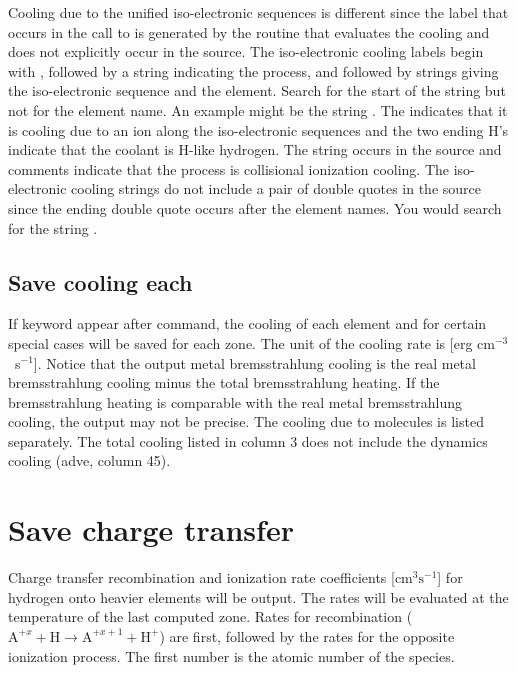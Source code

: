 Cooling due to the unified iso-electronic sequences is different since
the label that occurs in the call to  is generated by the routine
that evaluates the cooling and does not explicitly occur in the source.
The iso-electronic cooling labels begin with ,
followed by a string
indicating the process, and followed by strings giving the iso-electronic
sequence and the element.  Search for the start of the string but not for
the element name.  An example might be the string
.  The 
indicates that it is cooling due to an ion along the iso-electronic sequences
and the two ending H's indicate that the coolant is H-like hydrogen.  The
string  occurs in the source and comments indicate that the process
is collisional ionization cooling.  The iso-electronic cooling strings do
not include a pair of double quotes in the source since the ending double
quote occurs after the element names.  You would search for the string
.

\subsection{Save cooling each}

If keyword  appear after 
command, the cooling of each element and for certain
special cases will be saved for each zone. 
The unit of the cooling rate is [erg cm$^{-3}$~s$^{-1}$]. 
Notice that the output metal bremsstrahlung cooling is the real 
metal bremsstrahlung cooling minus the total bremsstrahlung heating. If the
bremsstrahlung heating is comparable with the real metal bremsstrahlung cooling,
the output may not be precise.
The cooling due to molecules is listed separately. The total cooling
listed in column 3 does not include the dynamics cooling (adve, column 45).

\section{Save charge transfer}

Charge transfer recombination and ionization rate coefficients
   [cm$^3\mathrm{s}^{-1}$]
for hydrogen onto heavier elements will be output.  The rates will be
evaluated at the temperature of the last computed zone.  Rates for
recombination (${\mathrm{A}}^{ + x}  + {\mathrm{H}}\to{\mathrm{A}}^{ + x + 1}  + {\mathrm{H}}^
+$) are first, followed by the rates for the opposite ionization process.
The first number is the atomic number of the species.

